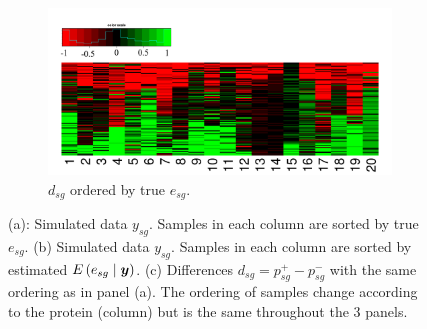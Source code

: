 \begin{figure}[H]
\begin{subfigure}[b]{0.98\textwidth}
        \centering
        \includegraphics[scale = 0.3]{./veera/estimated_d_heatmap_sim_final.png}
        \caption{$d_{sg}$ ordered by true $e_{sg}$.}
	\vspace{0.5 cm}
    \end{subfigure}
    \caption{(a): Simulated data $y_{sg}$. Samples in each column are sorted by true $e_{sg}$. (b) Simulated data $y_{sg}$. Samples in each column are sorted by estimated $E\left( e_{sg} \mid \mbox{\boldmath $y$} \right)$. (c) Differences $d_{sg}=p^+_{sg} - p^-_{sg}$ with the same ordering as in panel (a). The ordering of samples change according to the protein (column) but is the same throughout the 3 panels.}
\label{fig:sim_poe_heatmap_1}
\end{figure}






